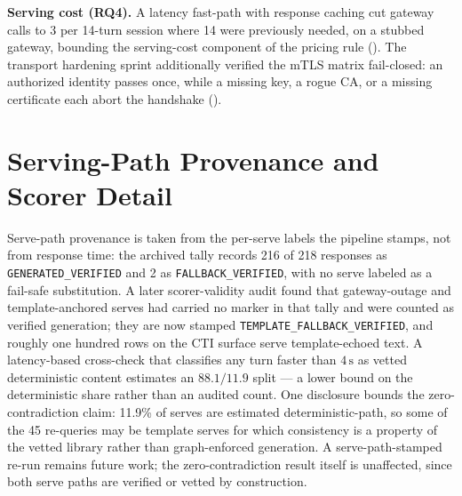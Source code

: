 \textbf{Serving cost (RQ4).} A latency fast-path with response caching
cut gateway calls to 3 per 14-turn session where 14 were previously
needed, on a stubbed gateway, bounding the serving-cost component of the pricing rule
(). The transport
hardening sprint additionally verified the mTLS matrix fail-closed: an
authorized identity passes once, while a missing key, a rogue CA, or a
missing certificate each abort the handshake
().

\section{Serving-Path Provenance and Scorer Detail}
\label{app:servingdetail}
Serve-path provenance is taken from the per-serve labels the pipeline stamps,
not from response time: the archived tally records 216 of 218 responses as
\texttt{GENERATED\_VERIFIED} and 2 as \texttt{FALLBACK\_VERIFIED}, with no
serve labeled as a fail-safe substitution. A later scorer-validity audit
found that gateway-outage and template-anchored serves had carried no marker
in that tally and were counted as verified generation; they are now stamped
\texttt{TEMPLATE\_FALLBACK\_VERIFIED}, and roughly one hundred rows on the
CTI surface serve template-echoed text. A latency-based cross-check that
classifies any turn faster than $4\,\mathrm{s}$ as vetted deterministic
content estimates an $88.1/11.9$ split --- a lower bound on the deterministic
share rather than an audited count. One disclosure bounds the
zero-contradiction claim: 11.9\% of serves are estimated deterministic-path,
so some of the 45 re-queries may be template serves for which consistency is
a property of the vetted library rather than graph-enforced generation. A
serve-path-stamped re-run remains future work; the zero-contradiction result
itself is unaffected, since both serve paths are verified or vetted by
construction.

